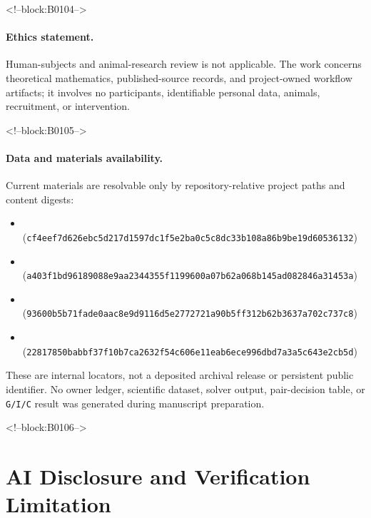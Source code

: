 \documentclass[11pt]{article}
\begin{document}
<!--block:B0104-->
\paragraph{Ethics statement.} Human-subjects and animal-research review
is not applicable. The work concerns theoretical mathematics,
published-source records, and project-owned workflow artifacts; it
involves no participants, identifiable personal data, animals,
recruitment, or intervention.

<!--block:B0105-->
\paragraph{Data and materials availability.} Current materials are
resolvable only by repository-relative project paths and content digests:
\begin{itemize}[leftmargin=*,itemsep=0pt,topsep=2pt]
\item {}\\
(\texttt{cf4eef7d\allowbreak{}626ebc5d\allowbreak{}217d1597\allowbreak{}dc1f5e2b\allowbreak{}a0c5c8dc\allowbreak{}33b108a8\allowbreak{}6b9be19d\allowbreak{}60536132})
\item {}\\
(\texttt{a403f1bd\allowbreak{}96189088\allowbreak{}e9aa2344\allowbreak{}355f1199\allowbreak{}600a07b6\allowbreak{}2a068b14\allowbreak{}5ad08284\allowbreak{}6a31453a})
\item {}\\
(\texttt{93600b5b\allowbreak{}71fade0a\allowbreak{}ac8e9d91\allowbreak{}16d5e277\allowbreak{}2721a90b\allowbreak{}5ff312b6\allowbreak{}2b3637a7\allowbreak{}02c737c8})
\item {}\\
(\texttt{22817850\allowbreak{}babbf37f\allowbreak{}10b7ca26\allowbreak{}32f54c60\allowbreak{}6e11eab6\allowbreak{}ece996db\allowbreak{}d7a3a5c6\allowbreak{}43e2cb5d})
\end{itemize}
These are internal locators, not a deposited archival release or persistent
public identifier. No owner ledger, scientific dataset, solver output,
pair-decision table, or \texttt{G/I/C} result was generated during manuscript
preparation.

<!--block:B0106-->
\hypertarget{ai-disclosure-and-verification-limitation}{%
\section*{AI Disclosure and Verification
Limitation}\label{ai-disclosure-and-verification-limitation}}
\end{document}
